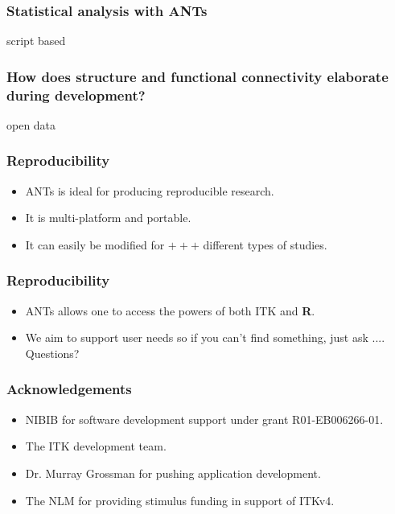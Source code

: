 \documentclass[18pt]{beamer}
\begin{document}
\begin{frame}
\frametitle{Statistical analysis with ANTs}
script based 
\end{frame}

\begin{frame}
\frametitle{How does structure and functional connectivity elaborate during development?}
open data
\end{frame}


\begin{frame}
\frametitle{Reproducibility}
\Huge
\begin{itemize}
\item ANTs is ideal for producing reproducible research.
\pause
\item It is multi-platform and portable.
\pause
\item It can easily be modified for $+++$ different types of studies. 
\end{itemize}
\end{frame}

\begin{frame}
\frametitle{Reproducibility}
\Huge
\begin{itemize}
\item ANTs allows one to access the powers of both ITK and {\bf
    R}. 
\pause
\item We aim to support user needs so if you can't find something,
  just ask .... Questions?
\end{itemize}
\end{frame}

\begin{frame}
\frametitle{Acknowledgements}
\Large
\begin{itemize}
\item NIBIB for software development support under grant R01-EB006266-01.
\item The ITK development team.
\item Dr. Murray Grossman for pushing application development.
\item The NLM for providing stimulus funding in support of ITKv4. 
\end{itemize}
\end{frame}
\end{document}
